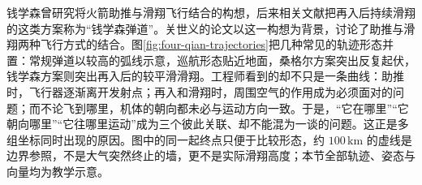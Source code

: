 \documentclass[a4paper,12pt,twoside,openany,fontset=none]{ctexbook}
\numberwithin{equation}{chapter}
\begin{document}
钱学森曾研究将火箭助推与滑翔飞行结合的构想，后来相关文献把再入后持续滑翔的这类方案称为“钱学森弹道”。关世义的论文以这一构想为背景，讨论了助推与滑翔两种飞行方式的结合。\cite{guan-qian-trajectory}图\ref{fig:four-qian-trajectories}把几种常见的轨迹形态并置：常规弹道以较高的弧线示意，巡航形态贴近地面，桑格尔方案突出反复起伏，钱学森方案则突出再入后的较平滑滑翔。工程师看到的却不只是一条曲线：助推时，飞行器逐渐离开发射点；再入和滑翔时，周围空气的作用成为必须面对的问题；而不论飞到哪里，机体的朝向都未必与运动方向一致。于是，“它在哪里”“它朝向哪里”“它往哪里运动”成为三个彼此关联、却不能混为一谈的问题。这正是多组坐标同时出现的原因。图中的同一起终点只便于比较形态，约 $100\,\mathrm{km}$ 的虚线是边界参照，不是大气突然终止的墙，更不是实际滑翔高度；本节全部轨迹、姿态与向量均为教学示意。

\setcounter{figure}{17}
\end{document}
